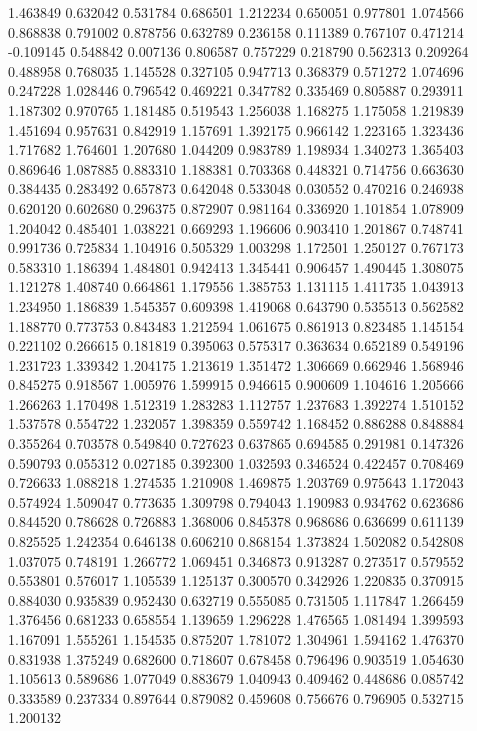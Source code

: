 1.463849
0.632042
0.531784
0.686501
1.212234
0.650051
0.977801
1.074566
0.868838
0.791002
0.878756
0.632789
0.236158
0.111389
0.767107
0.471214
-0.109145
0.548842
0.007136
0.806587
0.757229
0.218790
0.562313
0.209264
0.488958
0.768035
1.145528
0.327105
0.947713
0.368379
0.571272
1.074696
0.247228
1.028446
0.796542
0.469221
0.347782
0.335469
0.805887
0.293911
1.187302
0.970765
1.181485
0.519543
1.256038
1.168275
1.175058
1.219839
1.451694
0.957631
0.842919
1.157691
1.392175
0.966142
1.223165
1.323436
1.717682
1.764601
1.207680
1.044209
0.983789
1.198934
1.340273
1.365403
0.869646
1.087885
0.883310
1.188381
0.703368
0.448321
0.714756
0.663630
0.384435
0.283492
0.657873
0.642048
0.533048
0.030552
0.470216
0.246938
0.620120
0.602680
0.296375
0.872907
0.981164
0.336920
1.101854
1.078909
1.204042
0.485401
1.038221
0.669293
1.196606
0.903410
1.201867
0.748741
0.991736
0.725834
1.104916
0.505329
1.003298
1.172501
1.250127
0.767173
0.583310
1.186394
1.484801
0.942413
1.345441
0.906457
1.490445
1.308075
1.121278
1.408740
0.664861
1.179556
1.385753
1.131115
1.411735
1.043913
1.234950
1.186839
1.545357
0.609398
1.419068
0.643790
0.535513
0.562582
1.188770
0.773753
0.843483
1.212594
1.061675
0.861913
0.823485
1.145154
0.221102
0.266615
0.181819
0.395063
0.575317
0.363634
0.652189
0.549196
1.231723
1.339342
1.204175
1.213619
1.351472
1.306669
0.662946
1.568946
0.845275
0.918567
1.005976
1.599915
0.946615
0.900609
1.104616
1.205666
1.266263
1.170498
1.512319
1.283283
1.112757
1.237683
1.392274
1.510152
1.537578
0.554722
1.232057
1.398359
0.559742
1.168452
0.886288
0.848884
0.355264
0.703578
0.549840
0.727623
0.637865
0.694585
0.291981
0.147326
0.590793
0.055312
0.027185
0.392300
1.032593
0.346524
0.422457
0.708469
0.726633
1.088218
1.274535
1.210908
1.469875
1.203769
0.975643
1.172043
0.574924
1.509047
0.773635
1.309798
0.794043
1.190983
0.934762
0.623686
0.844520
0.786628
0.726883
1.368006
0.845378
0.968686
0.636699
0.611139
0.825525
1.242354
0.646138
0.606210
0.868154
1.373824
1.502082
0.542808
1.037075
0.748191
1.266772
1.069451
0.346873
0.913287
0.273517
0.579552
0.553801
0.576017
1.105539
1.125137
0.300570
0.342926
1.220835
0.370915
0.884030
0.935839
0.952430
0.632719
0.555085
0.731505
1.117847
1.266459
1.376456
0.681233
0.658554
1.139659
1.296228
1.476565
1.081494
1.399593
1.167091
1.555261
1.154535
0.875207
1.781072
1.304961
1.594162
1.476370
0.831938
1.375249
0.682600
0.718607
0.678458
0.796496
0.903519
1.054630
1.105613
0.589686
1.077049
0.883679
1.040943
0.409462
0.448686
0.085742
0.333589
0.237334
0.897644
0.879082
0.459608
0.756676
0.796905
0.532715
1.200132
